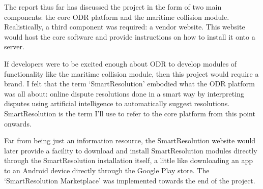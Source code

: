 The report thus far has discussed the project in the form of two main components: the core ODR platform and the maritime collision module. Realistically, a third component was required: a vendor website. This website would host the core software and provide instructions on how to install it onto a server.

If developers were to be excited enough about ODR to develop modules of functionality like the maritime collision module, then this project would require a brand. I felt that the term `SmartResolution' embodied what the ODR platform was all about: online dispute resolutions done in a smart way by interpreting disputes using artificial intelligence to automatically suggest resolutions. SmartResolution is the term I'll use to refer to the core platform from this point onwards.

Far from being just an information resource, the SmartResolution website would later provide a facility to download and install SmartResolution modules directly through the SmartResolution installation itself, a little like downloading an app to an Android device directly through the Google Play store. The `SmartResolution Marketplace' was implemented towards the end of the project.